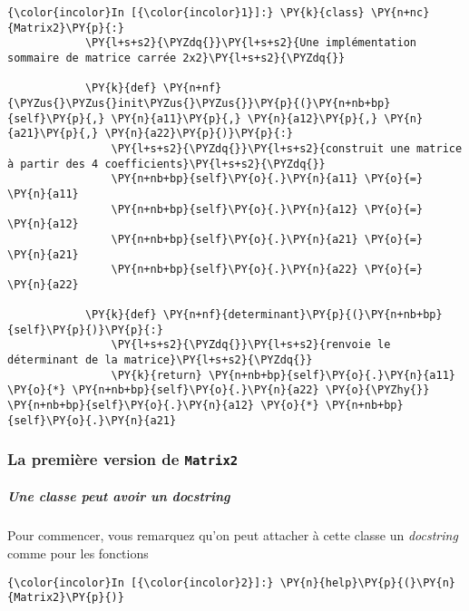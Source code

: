     \begin{Verbatim}[commandchars=\\\{\},frame=single,framerule=0.3mm,rulecolor=\color{cellframecolor}]
{\color{incolor}In [{\color{incolor}1}]:} \PY{k}{class} \PY{n+nc}{Matrix2}\PY{p}{:}
            \PY{l+s+s2}{\PYZdq{}}\PY{l+s+s2}{Une implémentation sommaire de matrice carrée 2x2}\PY{l+s+s2}{\PYZdq{}}
        
            \PY{k}{def} \PY{n+nf}{\PYZus{}\PYZus{}init\PYZus{}\PYZus{}}\PY{p}{(}\PY{n+nb+bp}{self}\PY{p}{,} \PY{n}{a11}\PY{p}{,} \PY{n}{a12}\PY{p}{,} \PY{n}{a21}\PY{p}{,} \PY{n}{a22}\PY{p}{)}\PY{p}{:}
                \PY{l+s+s2}{\PYZdq{}}\PY{l+s+s2}{construit une matrice à partir des 4 coefficients}\PY{l+s+s2}{\PYZdq{}}
                \PY{n+nb+bp}{self}\PY{o}{.}\PY{n}{a11} \PY{o}{=} \PY{n}{a11}
                \PY{n+nb+bp}{self}\PY{o}{.}\PY{n}{a12} \PY{o}{=} \PY{n}{a12}
                \PY{n+nb+bp}{self}\PY{o}{.}\PY{n}{a21} \PY{o}{=} \PY{n}{a21}
                \PY{n+nb+bp}{self}\PY{o}{.}\PY{n}{a22} \PY{o}{=} \PY{n}{a22}
                
            \PY{k}{def} \PY{n+nf}{determinant}\PY{p}{(}\PY{n+nb+bp}{self}\PY{p}{)}\PY{p}{:}
                \PY{l+s+s2}{\PYZdq{}}\PY{l+s+s2}{renvoie le déterminant de la matrice}\PY{l+s+s2}{\PYZdq{}}
                \PY{k}{return} \PY{n+nb+bp}{self}\PY{o}{.}\PY{n}{a11} \PY{o}{*} \PY{n+nb+bp}{self}\PY{o}{.}\PY{n}{a22} \PY{o}{\PYZhy{}} \PY{n+nb+bp}{self}\PY{o}{.}\PY{n}{a12} \PY{o}{*} \PY{n+nb+bp}{self}\PY{o}{.}\PY{n}{a21}
\end{Verbatim}


    \hypertarget{la-premiuxe8re-version-de-matrix2}{%
\subsubsection{\texorpdfstring{La première version de
\texttt{Matrix2}}{La première version de Matrix2}}\label{la-premiuxe8re-version-de-matrix2}}

    \hypertarget{une-classe-peut-avoir-un-docstring}{%
\subparagraph{\texorpdfstring{Une classe peut avoir un
\emph{docstring}}{Une classe peut avoir un docstring}}\label{une-classe-peut-avoir-un-docstring}}

    Pour commencer, vous remarquez qu'on peut attacher à cette classe un
\emph{docstring} comme pour les fonctions

    \begin{Verbatim}[commandchars=\\\{\},frame=single,framerule=0.3mm,rulecolor=\color{cellframecolor}]
{\color{incolor}In [{\color{incolor}2}]:} \PY{n}{help}\PY{p}{(}\PY{n}{Matrix2}\PY{p}{)}
\end{Verbatim}


